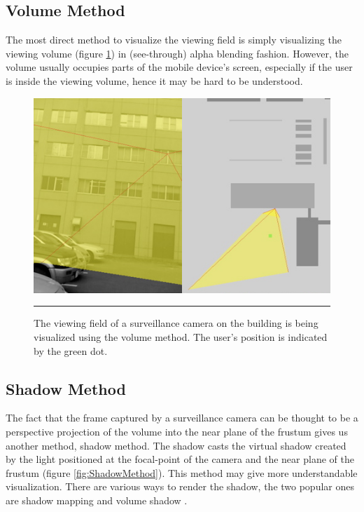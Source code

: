 \subsection{Volume Method}

The most direct method to visualize the viewing field is simply visualizing the viewing volume (figure \ref{fig:VolumeMethod}) in (see-through) alpha blending fashion. However, the volume usually occupies parts of the mobile device's screen, especially if the user is inside the viewing volume, hence it may be hard to be understood.

\begin{figure}[htbp]
	\centering
	\includegraphics[width=14cm]{./Primitives/theory_volume.png}
	\rule{35em}{0.5pt}
	\caption[Volume method]{The viewing field of a surveillance camera on the building is being visualized using the volume method. The user's position is indicated by the green dot.}
	\label{fig:VolumeMethod}
\end{figure}

\subsection{Shadow Method}
\label{ShadowMethod}

The fact that the frame captured by a surveillance camera can be thought to be a perspective projection of the volume into the near plane of the frustum gives us another method, shadow method. The shadow casts the virtual shadow created by the light positioned at the focal-point of the camera and the near plane of the frustum (figure \ref{fig:ShadowMethod}). This method may give more understandable visualization. There are various ways to render the shadow, the two popular ones are shadow mapping \cite{Reference7} \cite{Reference8} and volume shadow \cite{Reference9}.


